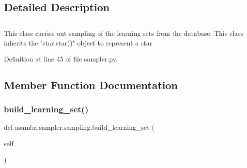 \subsection{Detailed Description}
\paragraph*{}

\subsection*{}

\subsection*{}

\subsection*{}

\subsection*{}

\subsection*{}

\subparagraph*{}

\begin{DoxyVerb}This class carries out sampling of the learning sets from the database. This class inherits the
"star.star()" object to represent a star
\end{DoxyVerb}
 

Definition at line 45 of file sampler.\+py.



\subsection{Member Function Documentation}
\mbox{\label{classasamba_1_1sampler_1_1sampling_abb689acce45526b082697abe45e2cb56}} 
\subsubsection{\texorpdfstring{build\+\_\+learning\+\_\+set()}{build\_learning\_set()}}
{\footnotesize\ttfamily def asamba.\+sampler.\+sampling.\+build\+\_\+learning\+\_\+set (\begin{DoxyParamCaption}\item[{}]{self }\end{DoxyParamCaption})}



